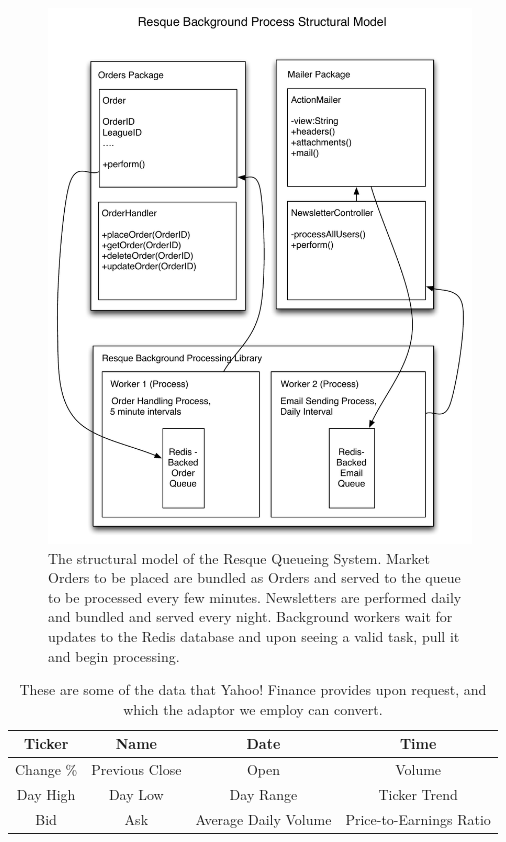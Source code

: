 \begin{figure}
\label{queuestruct}
\centering
\includegraphics[width=6.5in]{./Diagrams/ComponentModels/BackgroundProcessStructuralModel.pdf}
\caption{The structural model of the Resque Queueing System. Market Orders to be placed are 
bundled as Orders and served to the queue to be processed every few minutes. Newsletters are 
performed daily and bundled and served every night. Background workers wait for updates to
the Redis database and upon seeing a valid task, pull it and begin processing.}
\end{figure}

\begin{table}
\label{financeparams}
\centering
\renewcommand\arraystretch{1.5}
\begin{tabular}{|c|c|c|c|}
\hline
Ticker & Name & Date & Time \\
\hline
Change \% & Previous Close & Open & Volume \\
\hline
Day High & Day Low & Day Range & Ticker Trend \\
\hline
Bid & Ask & Average Daily Volume & Price-to-Earnings Ratio \\
\hline
\end{tabular}
\caption{These are some of the data that Yahoo! Finance provides upon request, and which the adaptor we employ
can convert.}
\end{table}
%

